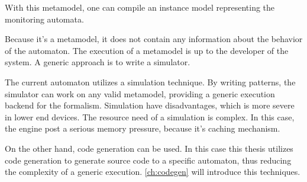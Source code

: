 With this metamodel, one can compile an instance model representing the monitoring automata.

Because it's a metamodel, it does not contain any information about the behavior of the automaton. The execution of a metamodel is up to the developer of the system. A generic approach is to write a simulator.

The current \viatrac{} automaton utilizes a simulation technique. By writing \viatraq{} patterns, the simulator can work on any valid metamodel, providing a generic execution backend for the formalism. Simulation have disadvantages, which is more severe in lower end devices. The resource need of a simulation is complex. In this case, the \viatraq{} engine post a serious memory pressure, because it's caching mechanism.

On the other hand, code generation can be used. In this case this thesis utilizes code generation to generate source code to a specific automaton, thus reducing the complexity of a generic execution. \cref{ch:codegen} will introduce this techniques.

